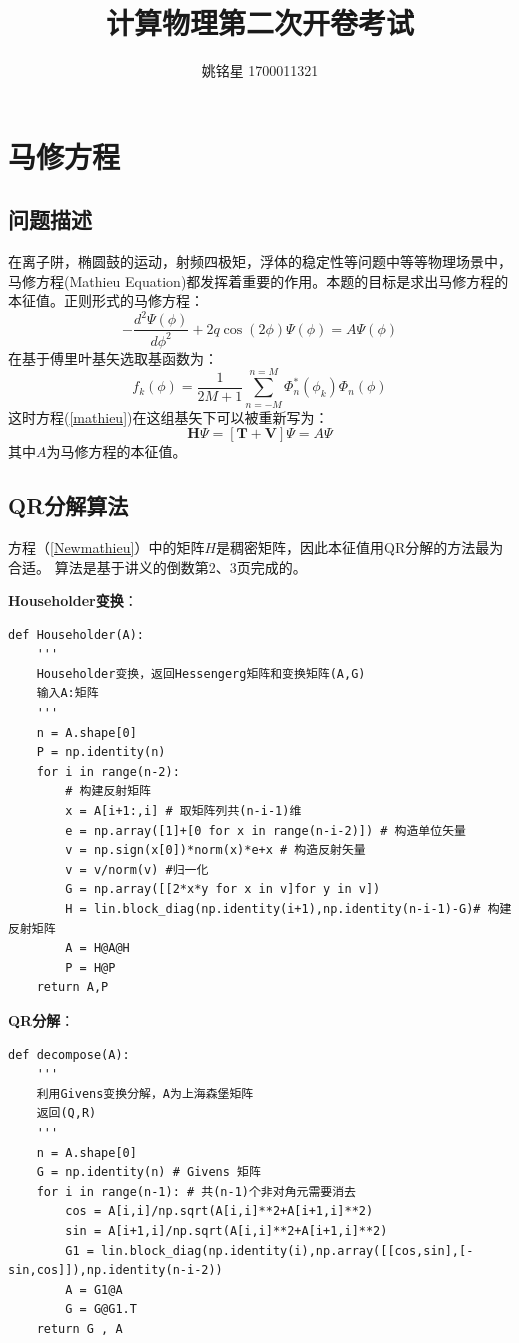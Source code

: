 \documentclass[a4paper]{ctexart}
\title{计算物理第二次开卷考试}
\author{姚铭星 1700011321}
\date{}
\begin{document}
\maketitle
\tableofcontents
\section{马修方程}
\subsection{问题描述}
在离子阱，椭圆鼓的运动，射频四极矩，浮体的稳定性等问题中等等物理场景中，马修方程(Mathieu Equation)都发挥着重要的作用。本题的目标是求出马修方程的本征值。正则形式的马修方程：
\begin{equation}
-\frac{d^{2} \Psi(\phi)}{d \phi^{2}}+2 q \cos (2 \phi) \Psi(\phi)=A \Psi(\phi)\label{mathieu}
\end{equation}
在基于傅里叶基矢选取基函数为：
\begin{equation}
f_{k}(\phi)=\frac{1}{2 M+1} \sum_{n=-M}^{n=M} \Phi_{n}^{*}\left(\phi_{k}\right) \Phi_{n}(\phi)
\end{equation}
这时方程(\ref{mathieu})在这组基矢下可以被重新写为：
\begin{equation}
\mathbf{H} \Psi=[\mathbf{T}+\mathbf{V}] \Psi=A \Psi\label{Newmathieu}
\end{equation}
其中$A$为马修方程的本征值。
\subsection{QR分解算法}
方程（\ref{Newmathieu}）中的矩阵$H$是稠密矩阵，因此本征值用QR分解的方法最为合适。
算法是基于讲义的倒数第2、3页完成的。

\textbf{Householder变换}：
\begin{lstlisting}
def Householder(A):
	'''
	Householder变换，返回Hessengerg矩阵和变换矩阵(A,G)
	输入A:矩阵
	'''
	n = A.shape[0]
	P = np.identity(n)
	for i in range(n-2):
		# 构建反射矩阵
		x = A[i+1:,i] # 取矩阵列共(n-i-1)维
		e = np.array([1]+[0 for x in range(n-i-2)]) # 构造单位矢量
		v = np.sign(x[0])*norm(x)*e+x # 构造反射矢量
		v = v/norm(v) #归一化 
		G = np.array([[2*x*y for x in v]for y in v])
		H = lin.block_diag(np.identity(i+1),np.identity(n-i-1)-G)# 构建反射矩阵
		A = H@A@H
		P = H@P
	return A,P
\end{lstlisting}

\textbf{QR分解}：
\begin{lstlisting}
def decompose(A):
	'''
	利用Givens变换分解，A为上海森堡矩阵
	返回(Q,R)
	'''
	n = A.shape[0]
	G = np.identity(n) # Givens 矩阵
	for i in range(n-1): # 共(n-1)个非对角元需要消去
		cos = A[i,i]/np.sqrt(A[i,i]**2+A[i+1,i]**2)
		sin = A[i+1,i]/np.sqrt(A[i,i]**2+A[i+1,i]**2)
		G1 = lin.block_diag(np.identity(i),np.array([[cos,sin],[-sin,cos]]),np.identity(n-i-2))
		A = G1@A
		G = G@G1.T
	return G , A
\end{lstlisting}
\end{document}
